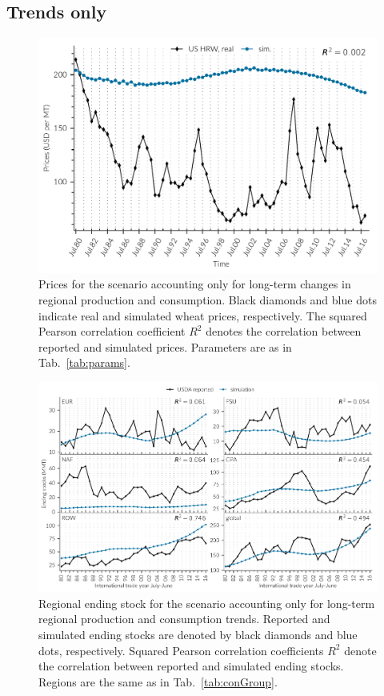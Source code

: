 \subsection{Trends only}
\begin{figure}[htbp]
\centering \includegraphics[width=.8\textwidth]{plots/trends_only/pric1980_2017}
\caption{Prices for the scenario accounting only for long-term changes in regional production and
  consumption. Black diamonds and blue dots indicate real and simulated wheat prices,
  respectively. The squared Pearson correlation coefficient $R^2$ denotes the correlation between
  reported and simulated prices. Parameters are as in Tab.~\ref{tab:params}.} %
  \label{fig:trendsOnly}
\end{figure}
\begin{figure}[ht]
  \centering \includegraphics[width=.8\textwidth]{plots/trends_only/Ending_stocks__MMT__1980_2017}
  \caption{Regional ending stock for the scenario accounting only for long-term regional production
    and consumption trends. Reported and simulated ending stocks are denoted by black diamonds and
    blue dots, respectively. Squared Pearson correlation coefficients $R^2$ denote the correlation
    between reported and simulated ending stocks. Regions are the same as in Tab.~\ref{tab:conGroup}.}
  \label{fig:stocks_trendsOnly}
\end{figure}
